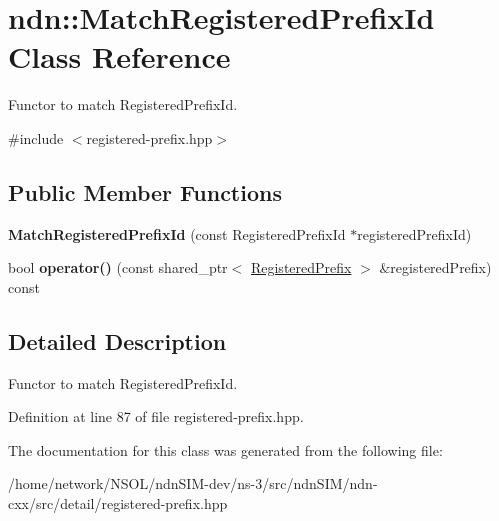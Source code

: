 \hypertarget{classndn_1_1MatchRegisteredPrefixId}{}\section{ndn\+:\+:Match\+Registered\+Prefix\+Id Class Reference}
\label{classndn_1_1MatchRegisteredPrefixId}


Functor to match Registered\+Prefix\+Id.  




{\ttfamily \#include $<$registered-\/prefix.\+hpp$>$}

\subsection*{Public Member Functions}
\begin{DoxyCompactItemize}
\item 
{\bfseries Match\+Registered\+Prefix\+Id} (const Registered\+Prefix\+Id $\ast$registered\+Prefix\+Id)\hypertarget{classndn_1_1MatchRegisteredPrefixId_ad2b8c4668789f981cf261ddda01bcb20}{}\label{classndn_1_1MatchRegisteredPrefixId_ad2b8c4668789f981cf261ddda01bcb20}

\item 
bool {\bfseries operator()} (const shared\+\_\+ptr$<$ \hyperlink{classndn_1_1RegisteredPrefix}{Registered\+Prefix} $>$ \&registered\+Prefix) const\hypertarget{classndn_1_1MatchRegisteredPrefixId_a4a6707c3d0a9917d4138c7f7042dd3d4}{}\label{classndn_1_1MatchRegisteredPrefixId_a4a6707c3d0a9917d4138c7f7042dd3d4}

\end{DoxyCompactItemize}


\subsection{Detailed Description}
Functor to match Registered\+Prefix\+Id. 

Definition at line 87 of file registered-\/prefix.\+hpp.



The documentation for this class was generated from the following file\+:\begin{DoxyCompactItemize}
\item 
/home/network/\+N\+S\+O\+L/ndn\+S\+I\+M-\/dev/ns-\/3/src/ndn\+S\+I\+M/ndn-\/cxx/src/detail/registered-\/prefix.\+hpp\end{DoxyCompactItemize}
